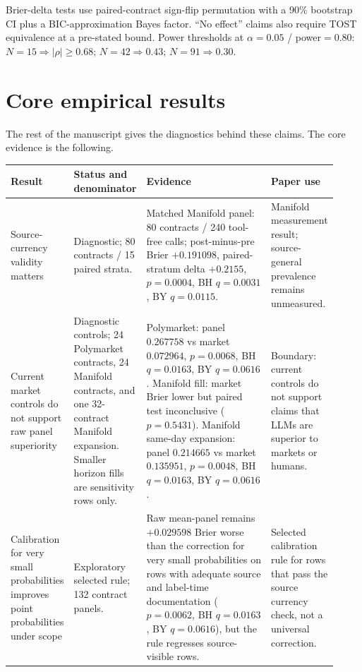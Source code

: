\documentclass[11pt]{article}
\begin{document}
Brier-delta tests use paired-contract sign-flip permutation with a 90\% bootstrap CI plus a BIC-approximation Bayes factor. ``No effect'' claims also require TOST equivalence at a pre-stated bound. Power thresholds at $\alpha{=}0.05$ / power$=0.80$: $N{=}15 \Rightarrow |\rho| \geq 0.68$; $N{=}42 \Rightarrow 0.43$; $N{=}91 \Rightarrow 0.30$.

\section{Core empirical results}
\label{sec:core-results}

The rest of the manuscript gives the diagnostics behind these claims. The core evidence is the following.

\begin{table}[htbp]
\centering
\scriptsize
\begin{tabular}{@{}L{0.17\linewidth} L{0.20\linewidth} L{0.39\linewidth} L{0.16\linewidth}@{}}
\toprule
Result & Status and denominator & Evidence & Paper use \\
\midrule
Source-currency validity matters & Diagnostic; 80 contracts / 15 paired strata. & Matched Manifold panel: 80 contracts / 240 tool-free calls; post-minus-pre Brier \(+0.191098\), paired-stratum delta \(+0.2155\), \(p=0.0004\), BH \(q=0.0031\), BY \(q=0.0115\). & Manifold measurement result; source-general prevalence remains unmeasured. \\
Current market controls do not support raw panel superiority & Diagnostic controls; 24 Polymarket contracts, 24 Manifold contracts, and one 32-contract Manifold expansion. Smaller horizon fills are sensitivity rows only. & Polymarket: panel \(0.267758\) vs market \(0.072964\), \(p=0.0068\), BH \(q=0.0163\), BY \(q=0.0616\). Manifold fill: market Brier lower but paired test inconclusive (\(p=0.5431\)). Manifold same-day expansion: panel \(0.214665\) vs market \(0.135951\), \(p=0.0048\), BH \(q=0.0163\), BY \(q=0.0616\). & Boundary: current controls do not support claims that LLMs are superior to markets or humans. \\
Calibration for very small probabilities improves point probabilities under scope & Exploratory selected rule; 132 contract panels. & Raw mean-panel remains \(+0.029598\) Brier worse than the correction for very small probabilities on rows with adequate source and label-time documentation (\(p=0.0062\), BH \(q=0.0163\), BY \(q=0.0616\)), but the rule regresses source-visible rows. & Selected calibration rule for rows that pass the source currency check, not a universal correction. \\

\end{tabular}
\end{table}
\end{document}
